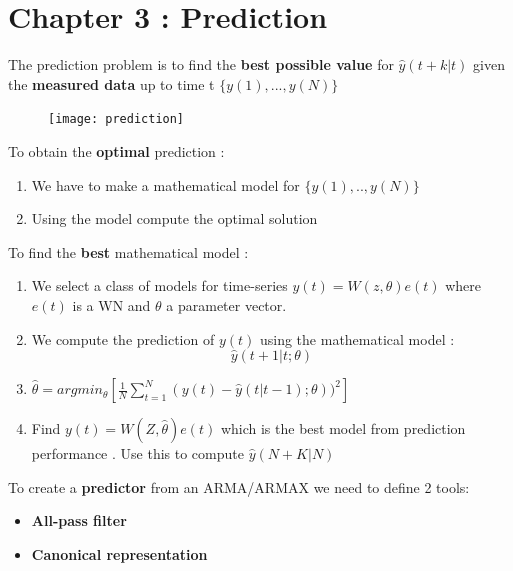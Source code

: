 \section{Chapter 3 : Prediction}
The prediction problem is to find the \textbf{best possible value} for $\hat{y}(t+k|t)$ given the \textbf{measured data} up to time t $\{y(1),...,y(N)\}$
\begin{figure}[H]
 \centering
  \texttt{[image: prediction]}
\end{figure}
To obtain the \textbf{optimal} prediction :
\begin{enumerate}
\item We have to make a mathematical model for $\{y(1),..,y(N)\}$
\item Using the model compute the optimal solution
\end{enumerate}
To find the \textbf{best} mathematical model :
\begin{enumerate}
\item We select a class of models for time-series $y(t)=W(z,\theta) e(t)$ where $e(t)$ is a WN and $\theta$ a parameter vector.
\item We compute the prediction of $y(t)$ using the mathematical model : $$ \hat{y}(t+1|t;\theta) $$
\item $\hat{\theta} = argmin_{\theta}[\frac{1}{N}\sum\limits_{t=1}^{N}(y(t)-\hat{y}(t|t-1);\theta))^2]$
\item Find $y(t) = W(Z,\hat{\theta})e(t)$ which is the best model from prediction performance . Use this to compute $\hat{y}(N+K|N)$
\end{enumerate}
To create a \textbf{predictor} from an ARMA/ARMAX we need to define 2 tools:
\begin{itemize}
\item \textbf{All-pass filter}
\item \textbf{Canonical representation}
\end{itemize}

